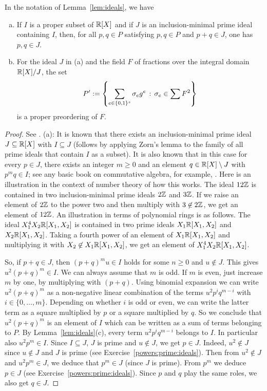 \goodbreak
\begin{lemma}
	\label{lem:prime:ideals}
	In the notation of Lemma~\ref{lem:ideals}, we have 
	\begin{enumerate}[(a)]
		\item If $I$ is a proper subset of $\mathbb{R}[X]$ and if $J$ is an inclusion-minimal prime ideal containing $I$, then, for all $p,q \in P$ satisfying $p, q \in P$ and $p+q \in J$, one has $p, q \in J$. 
		\item For the ideal $J$ in (a) and the field $F$ of fractions over the integral domain $\mathbb{R}[X] / J$, the set
		\[
			P' := \left\{  \sum_{e \in \{0,1\}^s} \sigma_e g^e  \,:\, \sigma_e \in \sum F^2 \right\}
		\] 
		is a proper preordering of $F$.
	\end{enumerate}
\end{lemma}
\begin{proof} See \cite[Prop.~2.1.7]{Marshall:2008}. 
 (a): It is known that there exists an inclusion-minimal prime ideal $J \subseteq \mathbb{R}[X]$ with $I \subseteq J$ (follows by applying Zorn's lemma to the family of all prime ideals that contain $I$ as a subset). It is also known that in this case for every $p \in J$, there exists an integer $m \ge 0$ and an element $q \in \mathbb{R}[X] \setminus J$ with $p^m q \in I$; see any basic book on commutative algebra, for example, \cite[Prop.~1.14]{Atiyah:Macdonald:2016}. Here is an illustration in the context of number theory of how this works. The ideal $12 \mathbb{Z}$ is contained in two inclusion-minimal prime ideals $2 \mathbb{Z}$ and $3 \mathbb{Z}$. If we raise an element of $2 \mathbb{Z}$ to the power two and then multiply with $3 \not\in 2 \mathbb{Z}$, we get an element of $12 \mathbb{Z}$. An illustration in terms of polynomial rings is as follows. The ideal $X_1^4 X_2 \mathbb{R}[X_1,X_2]$ is contained in two prime ideals $X_1 \mathbb{R}[X_1,X_2]$ and $X_2 \mathbb{R}[X_1,X_2]$. Taking a fourth power of an element of $X_1 \mathbb{R}[X_1,X_2]$ and multiplying it with $X_2 \not\in X_1 \mathbb{R}[X_1,X_2]$, we get an element of $X_1^4 X_2 \mathbb{R}[X_1,X_2]$. 
 
 So, if $p+q \in J$, then $(p+q)^m u \in I$ holds for some $n \ge 0$ and $u \not\in J$. This gives $u^2 (p+q)^m \in I$. We can always assume that $m$ is odd. If $m$ is even, just increase $m$ by one, by multiplying with $(p+q)$.  Using binomial expansion we can write $u^2 (p+q)^m$ as a non-negative linear combination of the terms $u^2 p^i q^{m-i}$ with $i \in \{0,\ldots,m\}$. Depending on whether $i$ is odd or even, we can write the latter term as a square multiplied by $p$ or a square multiplied by $q$. So we conclude that $u^2 (p+q)^m$ is an element of $I$ which can be written as a sum of terms belonging to $P$. By Lemma~\ref{lem:ideals}(c), every term $u^2 p^i q^{m-i}$ belongs to $I$. In particular also $u^2 p^m \in I$. Since $I \subseteq J$, $J$ is prime and $u \not \in J$, we get $p \in J$. Indeed, $u^2 \not \in J$ since $u \not\in J$ and $J$ is prime (see Exercise~\ref{powers:prime:ideals}). Then from $u^2 \not\in J$ and $u^2 p^m \in J$, we deduce that $p^m \in J$ (since $J$ is prime). From $p^m$ we deduce $p \in J$ (see Exercise~\ref{powers:prime:ideals}). Since $p$ and $q$ play the same roles, we also get $q \in J$. 


\end{proof}
